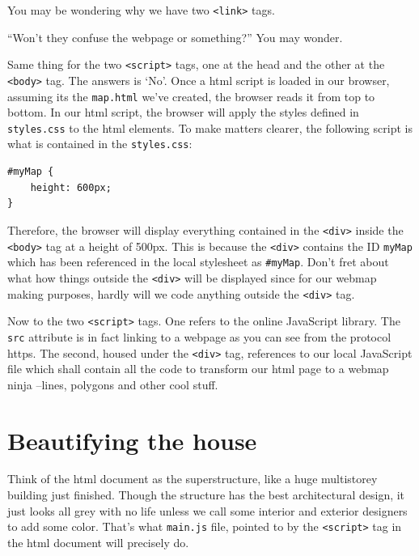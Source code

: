 \documentclass[
]{book}
\begin{document}
You may be wondering why we have two \texttt{\textless{}link\textgreater{}} tags.

``Won't they confuse the webpage or something?'' You may wonder.

Same thing for the two \texttt{\textless{}script\textgreater{}} tags, one at the head and the other at the \texttt{\textless{}body\textgreater{}} tag. The answers is `No'. Once a html script is loaded in our browser, assuming its the \texttt{map.html} we've created, the browser reads it from top to bottom. In our html script, the browser will apply the styles defined in \texttt{styles.css} to the html elements. To make matters clearer, the following script is what is contained in the \texttt{styles.css}:

\begin{verbatim}
#myMap { 
    height: 600px; 
}
\end{verbatim}

Therefore, the browser will display everything contained in the \texttt{\textless{}div\textgreater{}} inside the \texttt{\textless{}body\textgreater{}} tag at a height of 500px. This is because the \texttt{\textless{}div\textgreater{}} contains the ID \texttt{myMap} which has been referenced in the local stylesheet as \texttt{\#myMap}. Don't fret about what how things outside the \texttt{\textless{}div\textgreater{}} will be displayed since for our webmap making purposes, hardly will we code anything outside the \texttt{\textless{}div\textgreater{}} tag.

Now to the two \texttt{\textless{}script\textgreater{}} tags. One refers to the online JavaScript library. The \texttt{src} attribute is in fact linking to a webpage as you can see from the protocol https. The second, housed under the \texttt{\textless{}div\textgreater{}} tag, references to our local JavaScript file which shall contain all the code to transform our html page to a webmap ninja --lines, polygons and other cool stuff.

\hypertarget{beautifying-the-house}{%
\section{Beautifying the house}\label{beautifying-the-house}}

Think of the html document as the superstructure, like a huge multistorey building just finished. Though the structure has the best architectural design, it just looks all grey with no life unless we call some interior and exterior designers to add some color. That's what \texttt{main.js} file, pointed to by the \texttt{\textless{}script\textgreater{}} tag in the html document will precisely do.
\end{document}
